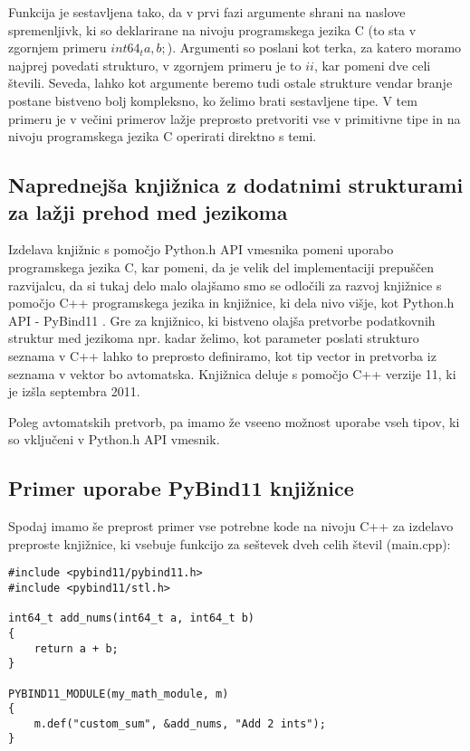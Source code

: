 \documentclass[a4paper,12pt,openright]{book}
\begin{document}
    \noindent
    Funkcija je sestavljena tako, da v prvi fazi argumente shrani na naslove spremenljivk, ki so deklarirane na nivoju programskega jezika C (to sta v zgornjem primeru $int64_t a, b;$). Argumenti so poslani kot terka, za katero moramo najprej povedati strukturo, v zgornjem primeru je to $ii$, kar pomeni dve celi števili. Seveda, lahko kot argumente beremo tudi ostale strukture vendar branje postane bistveno bolj kompleksno, ko želimo brati sestavljene tipe. V tem primeru je v večini primerov lažje preprosto pretvoriti vse v primitivne tipe in na nivoju programskega jezika C operirati direktno s temi.

    \subsection{Naprednejša knjižnica z dodatnimi strukturami za lažji prehod med jezikoma}

    Izdelava knjižnic s pomočjo Python.h API vmesnika pomeni uporabo programskega jezika C, kar pomeni, da je velik del implementaciji prepuščen razvijalcu, da si tukaj delo malo olajšamo smo se odločili za razvoj knjižnice s pomočjo C++ programskega jezika in knjižnice, ki dela nivo višje, kot Python.h API - PyBind11 \cite{PYBIND11_GITHUB}. Gre za knjižnico, ki bistveno olajša pretvorbe podatkovnih struktur med jezikoma npr. kadar želimo, kot parameter poslati strukturo seznama v C++ lahko to preprosto definiramo, kot tip vector in pretvorba iz seznama v vektor bo avtomatska. Knjižnica deluje s pomočjo C++ verzije 11, ki je izšla septembra 2011.

    Poleg avtomatskih pretvorb, pa imamo že vseeno možnost uporabe vseh tipov, ki so vključeni v Python.h API vmesnik.

    \subsection{Primer uporabe PyBind11 knjižnice}
    Spodaj imamo še preprost primer vse potrebne kode na nivoju C++ za izdelavo preproste knjižnice, ki vsebuje funkcijo za seštevek dveh celih števil (main.cpp):
\begin{verbatim}
#include <pybind11/pybind11.h>
#include <pybind11/stl.h>

int64_t add_nums(int64_t a, int64_t b)
{
    return a + b;
}

PYBIND11_MODULE(my_math_module, m)
{
    m.def("custom_sum", &add_nums, "Add 2 ints");
}
\end{verbatim}
\end{document}
